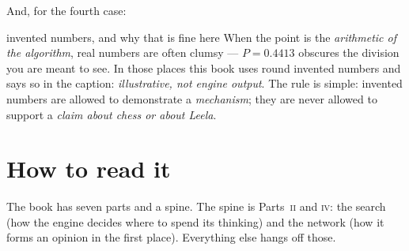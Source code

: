 \noindent And, for the fourth case:

\begin{worked}{invented numbers, and why that is fine here}
When the point is the \emph{arithmetic of the algorithm}, real numbers are often clumsy ---
$P = 0.4413$ obscures the division you are meant to see. In those places this book uses
round invented numbers and says so in the caption: \emph{illustrative, not engine output}.
The rule is simple: invented numbers are allowed to demonstrate a \emph{mechanism}; they
are never allowed to support a \emph{claim about chess or about Leela}.
\end{worked}

\section*{How to read it}

The book has seven parts and a spine. The spine is Parts~\textsc{ii} and \textsc{iv}: the
search (how the engine decides where to spend its thinking) and the network (how it forms
an opinion in the first place). Everything else hangs off those.

